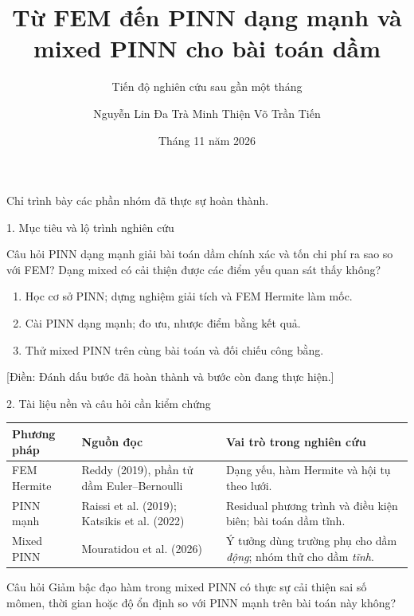 \documentclass[10pt,aspectratio=169]{beamer}
\title{Từ FEM đến PINN dạng mạnh và mixed PINN cho bài toán dầm}
\subtitle{Tiến độ nghiên cứu sau gần một tháng}
\author{Nguyễn Lin Đa \quad Trà Minh Thiện \quad Võ Trần Tiến}
\institute{Hướng dẫn: TS. Nguyễn Minh Nhân}
\date{Tháng 11 năm 2026}
\newcommand{\todo}[1]{{\color{red!70!black}[Điền: #1]}}
\begin{document}
\begin{frame}
  \titlepage
  \vspace{-4mm}
  \begin{center}\small Chỉ trình bày các phần nhóm đã thực sự hoàn thành.\end{center}
\end{frame}

\begin{frame}{1. Mục tiêu và lộ trình nghiên cứu}
\begin{block}{Câu hỏi}
PINN dạng mạnh giải bài toán dầm chính xác và tốn chi phí ra sao so với FEM? Dạng mixed có cải thiện được các điểm yếu quan sát thấy không?
\end{block}
\begin{enumerate}
  \item Học cơ sở PINN; dựng nghiệm giải tích và FEM Hermite làm mốc.
  \item Cài PINN dạng mạnh; đo ưu, nhược điểm bằng kết quả.
  \item Thử mixed PINN trên cùng bài toán và đối chiếu công bằng.
\end{enumerate}
\small\todo{Đánh dấu bước đã hoàn thành và bước còn đang thực hiện.}
\end{frame}

\begin{frame}{2. Tài liệu nền và câu hỏi cần kiểm chứng}
\small
\begin{tabular}{p{.18\linewidth}p{.37\linewidth}p{.37\linewidth}}
\toprule
Phương pháp & Nguồn đọc & Vai trò trong nghiên cứu\\
\midrule
FEM Hermite & Reddy (2019), phần tử dầm Euler--Bernoulli & Dạng yếu, hàm Hermite và hội tụ theo lưới.\\
PINN mạnh & Raissi et al. (2019); Katsikis et al. (2022) & Residual phương trình và điều kiện biên; bài toán dầm tĩnh.\\
Mixed PINN & Mouratidou et al. (2026) & Ý tưởng dùng trường phụ cho dầm \emph{động}; nhóm thử cho dầm \emph{tĩnh}.\\
\bottomrule
\end{tabular}
\vspace{3mm}
\begin{block}{Câu hỏi}
Giảm bậc đạo hàm trong mixed PINN có thực sự cải thiện sai số mômen, thời gian hoặc độ ổn định so với PINN mạnh trên bài toán này không?
\end{block}
\end{frame}
\end{document}

